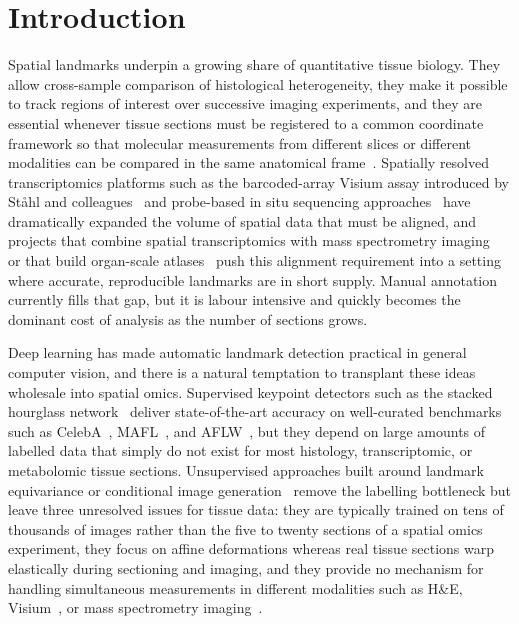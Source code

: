 
\section{Introduction}

Spatial landmarks underpin a growing share of quantitative tissue biology. They allow cross-sample comparison of histological heterogeneity, they make it possible to track regions of interest over successive imaging experiments, and they are essential whenever tissue sections must be registered to a common coordinate framework so that molecular measurements from different slices or different modalities can be compared in the same anatomical frame~\cite{moses2022museum,marx2021method}. Spatially resolved transcriptomics platforms such as the barcoded-array Visium assay introduced by St\aa hl and colleagues~\cite{stahl2016visualization} and probe-based in situ sequencing approaches~\cite{ke2013insitu} have dramatically expanded the volume of spatial data that must be aligned, and projects that combine spatial transcriptomics with mass spectrometry imaging~\cite{vicari2024spatial} or that build organ-scale atlases~\cite{asp2019spatiotemporal} push this alignment requirement into a setting where accurate, reproducible landmarks are in short supply. Manual annotation currently fills that gap, but it is labour intensive and quickly becomes the dominant cost of analysis as the number of sections grows.

Deep learning has made automatic landmark detection practical in general computer vision, and there is a natural temptation to transplant these ideas wholesale into spatial omics. Supervised keypoint detectors such as the stacked hourglass network~\cite{newell2016stacked} deliver state-of-the-art accuracy on well-curated benchmarks such as CelebA~\cite{liu2015celeba}, MAFL~\cite{zhang2016learning}, and AFLW~\cite{kostinger2011aflw}, but they depend on large amounts of labelled data that simply do not exist for most histology, transcriptomic, or metabolomic tissue sections. Unsupervised approaches built around landmark equivariance or conditional image generation~\cite{thewlis2017unsupervised,jakab2018conditional,zhang2018unsupervised,sanchez2019object,jakab2020selfsupervised} remove the labelling bottleneck but leave three unresolved issues for tissue data: they are typically trained on tens of thousands of images rather than the five to twenty sections of a spatial omics experiment, they focus on affine deformations whereas real tissue sections warp elastically during sectioning and imaging, and they provide no mechanism for handling simultaneous measurements in different modalities such as H\&E, Visium~\cite{stahl2016visualization}, or mass spectrometry imaging~\cite{vicari2024spatial}.

